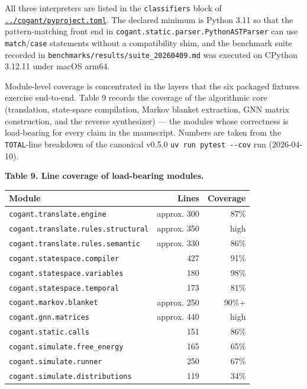 \documentclass[
]{article}
\newcounter{none} %
\begin{document}
All three interpreters are listed in the \texttt{classifiers} block of
\href{../cogant/pyproject.toml}{\texttt{../cogant/pyproject.toml}}. The
declared minimum is Python 3.11 so that the pattern-matching front end
in \texttt{cogant.static.parser.PythonASTParser} can use
\texttt{match}/\texttt{case} statements without a compatibility shim,
and the benchmark suite recorded in
\texttt{benchmarks/results/suite\_20260409.md} was executed on CPython
3.12.11 under macOS arm64.

Module-level coverage is concentrated in the layers that the six
packaged fixtures exercise end-to-end. Table 9 records the coverage of
the algorithmic core (translation, state-space compilation, Markov
blanket extraction, GNN matrix construction, and the reverse
synthesizer) --- the modules whose correctness is load-bearing for every
claim in the manuscript. Numbers are taken from the \texttt{TOTAL}-line
breakdown of the canonical v0.5.0 \texttt{uv\ run\ pytest\ -\/-cov} run
(2026-04-10).

\textbf{Table 9. Line coverage of load-bearing modules.}

{\def\LTcaptype{none} %
\begin{longtable}[]{@{}lrr@{}}
\toprule\noalign{}
Module & Lines & Coverage \\
\midrule\noalign{}
\endhead
\bottomrule\noalign{}
\endlastfoot
\texttt{cogant.translate.engine} & approx. 300 & 87\% \\
\texttt{cogant.translate.rules.structural} & approx. 350 & high \\
\texttt{cogant.translate.rules.semantic} & approx. 330 & 86\% \\
\texttt{cogant.statespace.compiler} & 427 & 91\% \\
\texttt{cogant.statespace.variables} & 180 & 98\% \\
\texttt{cogant.statespace.temporal} & 173 & 81\% \\
\texttt{cogant.markov.blanket} & approx. 250 & 90\%+ \\
\texttt{cogant.gnn.matrices} & approx. 440 & high \\
\texttt{cogant.static.calls} & 151 & 86\% \\
\texttt{cogant.simulate.free\_energy} & 165 & 65\% \\
\texttt{cogant.simulate.runner} & 250 & 67\% \\
\texttt{cogant.simulate.distributions} & 119 & 34\% \\
\end{longtable}
}
\end{document}
